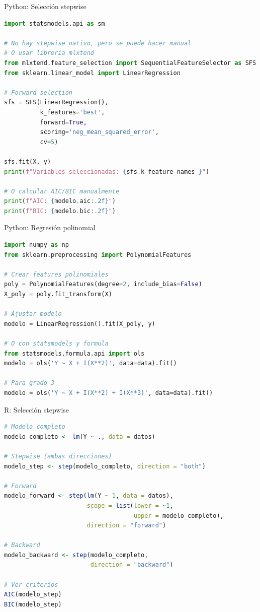\documentclass[aspectratio=169]{beamer}
\begin{document}
\begin{frame}[fragile]{Python: Selección stepwise}
\begin{lstlisting}[language=Python]
import statsmodels.api as sm

# No hay stepwise nativo, pero se puede hacer manual
# O usar libreria mlxtend
from mlxtend.feature_selection import SequentialFeatureSelector as SFS
from sklearn.linear_model import LinearRegression

# Forward selection
sfs = SFS(LinearRegression(), 
          k_features='best',
          forward=True, 
          scoring='neg_mean_squared_error',
          cv=5)

sfs.fit(X, y)
print(f"Variables seleccionadas: {sfs.k_feature_names_}")

# O calcular AIC/BIC manualmente
print(f"AIC: {modelo.aic:.2f}")
print(f"BIC: {modelo.bic:.2f}")
\end{lstlisting}
\end{frame}

\begin{frame}[fragile]{Python: Regresión polinomial}
\begin{lstlisting}[language=Python]
import numpy as np
from sklearn.preprocessing import PolynomialFeatures

# Crear features polinomiales
poly = PolynomialFeatures(degree=2, include_bias=False)
X_poly = poly.fit_transform(X)

# Ajustar modelo
modelo = LinearRegression().fit(X_poly, y)

# O con statsmodels y formula
from statsmodels.formula.api import ols
modelo = ols('Y ~ X + I(X**2)', data=data).fit()

# Para grado 3
modelo = ols('Y ~ X + I(X**2) + I(X**3)', data=data).fit()
\end{lstlisting}
\end{frame}

\begin{frame}[fragile]{R: Selección stepwise}
\begin{lstlisting}[language=R]
# Modelo completo
modelo_completo <- lm(Y ~ ., data = datos)

# Stepwise (ambas direcciones)
modelo_step <- step(modelo_completo, direction = "both")

# Forward
modelo_forward <- step(lm(Y ~ 1, data = datos),
                       scope = list(lower = ~1, 
                                    upper = modelo_completo),
                       direction = "forward")

# Backward
modelo_backward <- step(modelo_completo, 
                        direction = "backward")

# Ver criterios
AIC(modelo_step)
BIC(modelo_step)
\end{lstlisting}
\end{frame}
\end{document}

